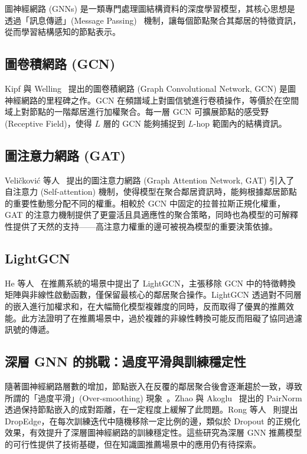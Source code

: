圖神經網路 (GNNs) 是一類專門處理圖結構資料的深度學習模型，其核心思想是透過「訊息傳遞」(Message Passing)~\cite{gilmer2017mpnn} 機制，讓每個節點聚合其鄰居的特徵資訊，從而學習結構感知的節點表示。

\subsection*{圖卷積網路 (GCN)}

Kipf 與 Welling~\cite{kipf2017gcn} 提出的圖卷積網路 (Graph Convolutional Network, GCN) 是圖神經網路的里程碑之作。GCN 在頻譜域上對圖信號進行卷積操作，等價於在空間域上對節點的一階鄰居進行加權聚合。每一層 GCN 可擴展節點的感受野 (Receptive Field)，使得 $L$ 層的 GCN 能夠捕捉到 $L$-hop 範圍內的結構資訊。

\subsection*{圖注意力網路 (GAT)}

Veli\v{c}kovi\'{c} 等人~\cite{velickovic2018gat} 提出的圖注意力網路 (Graph Attention Network, GAT) 引入了自注意力 (Self-attention) 機制，使得模型在聚合鄰居資訊時，能夠根據鄰居節點的重要性動態分配不同的權重。相較於 GCN 中固定的拉普拉斯正規化權重，GAT 的注意力機制提供了更靈活且具適應性的聚合策略，同時也為模型的可解釋性提供了天然的支持——高注意力權重的邊可被視為模型的重要決策依據。

\subsection*{LightGCN}

He 等人~\cite{he2020lightgcn} 在推薦系統的場景中提出了 LightGCN，主張移除 GCN 中的特徵轉換矩陣與非線性啟動函數，僅保留最核心的鄰居聚合操作。LightGCN 透過對不同層的嵌入進行加權求和，在大幅簡化模型複雜度的同時，反而取得了優異的推薦效能。此方法證明了在推薦場景中，過於複雜的非線性轉換可能反而阻礙了協同過濾訊號的傳遞。

\subsection*{深層 GNN 的挑戰：過度平滑與訓練穩定性}

隨著圖神經網路層數的增加，節點嵌入在反覆的鄰居聚合後會逐漸趨於一致，導致所謂的「過度平滑」(Over-smoothing) 現象~\cite{li2018deeper}。Zhao 與 Akoglu~\cite{zhao2020pairnorm} 提出的 PairNorm 透過保持節點嵌入的成對距離，在一定程度上緩解了此問題。Rong 等人~\cite{rong2020dropedge} 則提出 DropEdge，在每次訓練迭代中隨機移除一定比例的邊，類似於 Dropout 的正規化效果，有效提升了深層圖神經網路的訓練穩定性。這些研究為深層 GNN 推薦模型的可行性提供了技術基礎，但在知識圖推薦場景中的應用仍有待探索。

